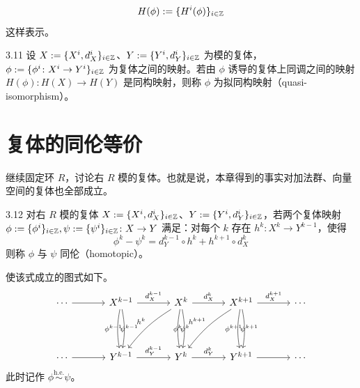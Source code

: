 
\[
H(\phi):=\{H^i(\phi)\}_{i\in\mathbb{Z}}
\]
这样表示。

\begin{definition}{3.11}
设 $X:=\{X^i,d_X^i\}_{i\in\mathbb{Z}}$、$Y:=\{Y^i,d_Y^i\}_{i\in\mathbb{Z}}$ 为模的复体，$\phi:=\{\phi^i\colon X^i\to Y^i\}_{i\in\mathbb{Z}}$ 为复体之间的映射。若由 $\phi$ 诱导的复体上同调之间的映射 $H(\phi)\colon H(X)\to H(Y)$ 是同构映射，则称 $\phi$ 为拟同构映射（quasi-isomorphism）。
\end{definition}


\section{复体的同伦等价}

继续固定环 $R$，讨论右 $R$ 模的复体。也就是说，本章得到的事实对加法群、向量空间的复体也全部成立。

\begin{definition}{3.12}
对右 $R$ 模的复体 $X:=\{X^i,d_X^i\}_{i\in\mathbb{Z}}$、$Y:=\{Y^i,d_Y^i\}_{i\in\mathbb{Z}}$，若两个复体映射 $\phi:=\{\phi^i\}_{i\in\mathbb{Z}},\psi:=\{\psi^i\}_{i\in\mathbb{Z}}\colon X\to Y$ 满足：对每个 $k$ 存在 $h^k\colon X^k\to Y^{k-1}$，使得
\[
\phi^k-\psi^k=d_Y^{k-1}\circ h^k+h^{k+1}\circ d_X^k
\]
则称 $\phi$ 与 $\psi$ 同伦（homotopic）。
\end{definition}

使该式成立的图式如下。
\[
\begin{tikzcd}[row sep=4.0em, column sep=3.4em]
\cdots \arrow[r] & X^{k-1} \arrow[r,"d_X^{k-1}"] \arrow[d,bend right=10,"\psi^{k-1}"] \arrow[d,bend left=10,"\phi^{k-1}"'] & X^k \arrow[r,"d_X^k"] \arrow[dl,bend right=10,"h^k"'] \arrow[d,bend right=10,"\psi^k"] \arrow[d,bend left=10,"\phi^k"'] & X^{k+1} \arrow[r,"d_X^{k+1}"] \arrow[dl,bend right=10,"h^{k+1}"'] \arrow[d,bend right=10,"\psi^{k+1}"] \arrow[d,bend left=10,"\phi^{k+1}"'] & \cdots \\
\cdots \arrow[r] & Y^{k-1} \arrow[r,"d_Y^{k-1}"] & Y^k \arrow[r,"d_Y^k"] & Y^{k+1} \arrow[r] & \cdots
\end{tikzcd}
\]
此时记作 $\phi\overset{\mathrm{h.e.}}{\sim}\psi$。

